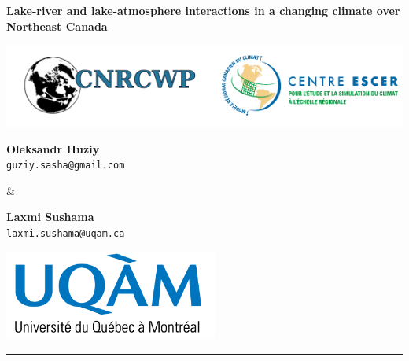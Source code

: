 \documentclass[a0,landscape]{a0poster}
\begin{document}


\noindent\begin{minipage}[t]{\linewidth}
\centering
\noindent \veryHuge \color{NavyBlue} \textbf{Lake-river and lake-atmosphere interactions in a changing climate over Northeast Canada} \color{Black}\\ %
\vspace{0.5cm}
\noindent\begin{minipage}[b]{0.2\linewidth}
      \center
      \includegraphics[width=15cm]{logo_cnrcwp_escer.png} %
\end{minipage}
%
\begin{minipage}[t]{0.6\linewidth} %
  \center
  \begin{minipage}[t]{0.4\linewidth}
  \center
  \huge \textbf{Oleksandr Huziy} \\
        \texttt{guziy.sasha@gmail.com}
  \end{minipage}
  \begin{minipage}[t]{0.05\linewidth}
   \center
   \&
  \end{minipage}
  \begin{minipage}[t]{0.4\linewidth}
     \center
     \huge \textbf{Laxmi Sushama} \\
     \texttt{laxmi.sushama@uqam.ca}
  \end{minipage}
\end{minipage}
%
\begin{minipage}[b]{0.18\linewidth}
  \center
  \includegraphics[width=7cm]{logo_uqam.png} %
\end{minipage}
\rule{\linewidth}{2pt}
\end{minipage}
%
\end{document}
